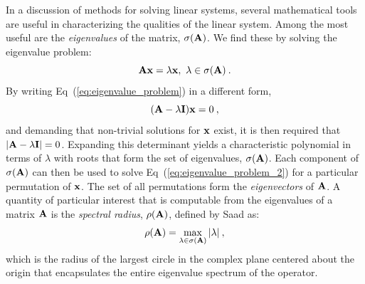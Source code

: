In a discussion of methods for solving linear systems, several
mathematical tools are useful in characterizing the qualities of the
linear system. Among the most useful are the \textit{eigenvalues} of
the matrix, $\sigma(\mathbf{A})$. We find these by solving the eigenvalue
problem:
\begin{equation}
  \mathbf{A} \mathbf{x} = \lambda \mathbf{x},\ \lambda \in \sigma(\mathbf{A})\:.
  \label{eq:eigenvalue_problem}
\end{equation}
By writing Eq~(\ref{eq:eigenvalue_problem}) in a different form,
\begin{equation}
  (\mathbf{A} - \lambda \mathbf{I})\mathbf{x} = 0 \:,
  \label{eq:eigenvalue_problem_2}
\end{equation}
and demanding that non-trivial solutions for $\mathbf{x}$ exist, it is
then required that $|\mathbf{A} - \lambda \mathbf{I}| = 0$. Expanding this
determinant yields a characteristic polynomial in terms of $\lambda$
with roots that form the set of eigenvalues, $\sigma(\mathbf{A})$. Each
component of $\sigma(\mathbf{A})$ can then be used to solve
Eq~(\ref{eq:eigenvalue_problem_2}) for a particular permutation of
$\mathbf{x}$. The set of all permutations form the \textit{eigenvectors}
of $\mathbf{A}$. A quantity of particular interest that is computable from
the eigenvalues of a matrix $\mathbf{A}$ is the \textit{spectral radius},
$\rho(\mathbf{A})$, defined by Saad \cite{saad_iterative_2003} as:
\begin{equation}
  \rho(\mathbf{A}) = \max_{\lambda \in \sigma(\mathbf{A})} |\lambda| \:,
  \label{eq:spectral_radius}
\end{equation}
which is the radius of the largest circle in the complex plane
centered about the origin that encapsulates the entire eigenvalue
spectrum of the operator.

